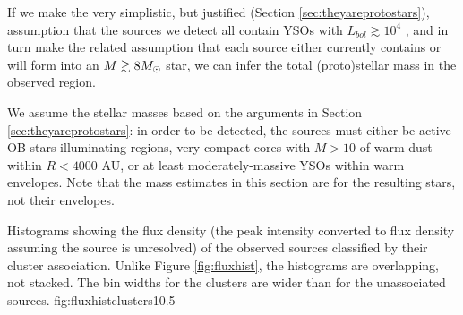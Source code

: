 \documentclass[twocolumn]{aastex61}
\begin{document}
If we make the very simplistic, but justified (Section
\ref{sec:theyareprotostars}), assumption that the sources we detect all contain
YSOs with $L_{bol}\gtrsim10^4$ \lsun, and in turn make the related
assumption that each source either currently contains or will form into an
$M\gtrsim8 M_{\odot}$ star, we can infer the total (proto)stellar mass in the
observed region.


We assume the stellar masses based on the arguments in Section
\ref{sec:theyareprotostars}: in order to be detected, the sources must either
be active OB stars illuminating \hii regions, very compact cores with $M>10$
\msun of warm dust within $R<4000$ AU, or at least moderately-massive YSOs
within warm envelopes.  Note that the mass estimates in this section are for
the resulting stars, not their envelopes.  




{Histograms showing the flux density (the peak intensity converted to flux density
assuming the source is unresolved) of the observed sources classified by their
cluster association.  Unlike Figure \ref{fig:fluxhist}, the histograms are
overlapping, not stacked.  The bin widths for the clusters are wider than
for the unassociated sources.}
{fig:fluxhistclusters}{1}{0.5\textwidth}
\end{document}
